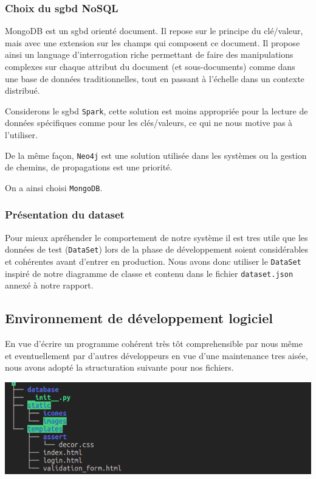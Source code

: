 \documentclass[12pt]{report}
\begin{document}
			\subsubsection{ \bf {\sc Choix du sgbd NoSQL}}
			
			MongoDB est un sgbd orienté document. 
			Il repose sur le principe du clé/valeur, mais avec une extension sur les champs qui composent ce document.
			Il propose ainsi un language  d'interrogation riche permettant de faire des manipulations complexes sur chaque attribut du document (et sous-documents) comme dans une base de données traditionnelles, tout en passant à l'échelle dans un contexte distribué.
			
			Considerons le sgbd {\tt Spark}, cette solution est moins appropriée pour la lecture de données spécifiques comme pour les clés/valeurs, ce qui ne nous motive pas à l'utiliser.
			
		
			
			De la même façon, {\tt Neo4j} est une solution utilisée dans les systèmes ou la gestion de chemins, de propagations est une priorité.  
			
		On a ainsi choisi {\tt MongoDB}.
		
		\subsubsection{\sc Présentation du dataset}
			
		Pour mieux apréhender le comportement de notre système il est tres utile que les données de test ({\tt DataSet}) lors de la phase de développement soient considérables et cohérentes avant d'entrer en production. Nous avons donc utiliser le {\tt DataSet} inspiré de notre diagramme de classe et contenu dans le fichier {\tt dataset.json} annexé à notre rapport.
		

		
	\subsection{\sc Environnement de développement logiciel}

	
	
	
	En vue d'écrire un programme cohérent très tôt comprehensible par nous même et eventuellement par d'autres développeurs en vue d'une maintenance tres aisée, nous avons adopté la structuration suivante pour nos  fichiers. 
	\begin{center}
		\includegraphics[scale=1, width=0.8\columnwidth]{archi}
	\end{center}
	
\end{document}
